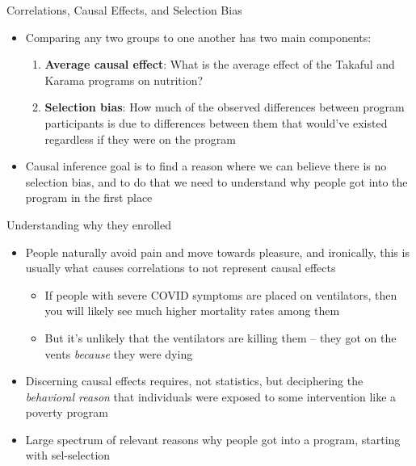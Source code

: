 \documentclass{beamer}
\begin{document}
\begin{frame}{Correlations, Causal Effects, and Selection Bias}

\begin{itemize}
\item Comparing any two groups to one another has two main components:
	\begin{enumerate}
	\item \textbf{Average causal effect}: What is the average effect of the Takaful  and Karama programs on nutrition?
	\item \textbf{Selection bias}: How much of the observed differences between program participants is due to differences between them that would've existed regardless if they were on the program
	\end{enumerate}
\item Causal inference goal is to find a reason where we can believe there is no selection bias, and to do that we need to understand why people got into the program in the first place

\end{itemize}

\end{frame}



  



\begin{frame}{Understanding why they enrolled}
\begin{itemize}
\item People naturally avoid pain and move towards pleasure, and ironically, this is usually what causes correlations to not represent causal effects
	\begin{itemize}
	\item If people with severe COVID symptoms are placed on ventilators, then you will likely see much higher mortality rates among them
	\item But it's unlikely that the ventilators are killing them -- they got on the vents \emph{because} they were dying
	\end{itemize}
\item Discerning causal effects requires, not statistics, but deciphering the  \emph{behavioral reason} that individuals were exposed to some intervention like a poverty program
\item Large spectrum of relevant reasons why people got into a program, starting with sel-selection
\end{itemize}
\end{frame}
\end{document}
